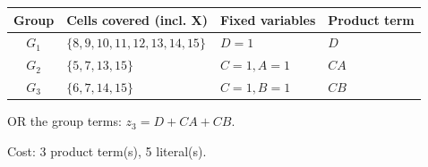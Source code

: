 \documentclass[a4paper,11pt]{article}
\begin{document}
\begin{minipage}{\textwidth}
\begin{center}\small
\begin{tabular}{clll}
\toprule
Group & Cells covered (incl. X) & Fixed variables & Product term\\\midrule
\textcolor{blue!75!black}{$G_{1}$} & $\{8,9,10,11,12,13,14,15\}$ & $D=1$ & $D$\\
\textcolor{red!75!black}{$G_{2}$} & $\{5,7,13,15\}$ & $C=1,A=1$ & $CA$\\
\textcolor{teal!80!black}{$G_{3}$} & $\{6,7,14,15\}$ & $C=1,B=1$ & $CB$\\
\bottomrule\end{tabular}\end{center}


\noindent OR the group terms: $\boxed{z_3=D + CA + CB}$.

\noindent Cost: 3 product term(s), 5 literal(s).

\end{minipage}\par\vspace{0.25cm}
\end{document}
